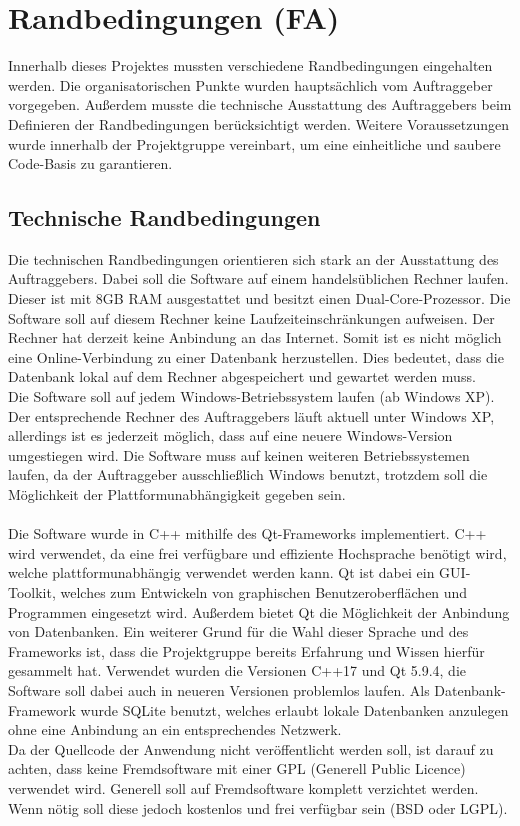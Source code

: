 \section{Randbedingungen (FA)}
Innerhalb dieses Projektes mussten verschiedene Randbedingungen eingehalten werden. Die organisatorischen Punkte wurden hauptsächlich vom Auftraggeber vorgegeben. Außerdem musste die technische Ausstattung des Auftraggebers beim Definieren der Randbedingungen berücksichtigt werden. Weitere Voraussetzungen wurde innerhalb der Projektgruppe vereinbart, um eine einheitliche und saubere Code-Basis zu garantieren.

\subsection{Technische Randbedingungen}
Die technischen Randbedingungen orientieren sich stark an der Ausstattung des Auftraggebers. Dabei soll die Software auf einem handelsüblichen Rechner laufen. Dieser ist mit 8GB RAM ausgestattet und besitzt einen Dual-Core-Prozessor. Die Software soll auf diesem Rechner keine Laufzeiteinschränkungen aufweisen. Der Rechner hat derzeit keine Anbindung an das Internet. Somit ist es nicht möglich eine Online-Verbindung zu einer Datenbank herzustellen. Dies bedeutet, dass die Datenbank lokal auf dem Rechner abgespeichert und gewartet werden muss.\\
Die Software soll auf jedem Windows-Betriebssystem laufen (ab Windows XP). Der entsprechende Rechner des Auftraggebers läuft aktuell unter Windows XP, allerdings ist es jederzeit möglich, dass auf eine neuere Windows-Version umgestiegen wird. Die Software muss auf keinen weiteren Betriebssystemen laufen, da der Auftraggeber ausschließlich Windows benutzt, trotzdem soll die Möglichkeit der Plattformunabhängigkeit gegeben sein.\\
\\
Die Software wurde in C++ mithilfe des Qt-Frameworks implementiert. C++ wird verwendet, da eine frei verfügbare und effiziente Hochsprache benötigt wird, welche plattformunabhängig verwendet werden kann. Qt ist dabei ein GUI-Toolkit, welches zum Entwickeln von graphischen Benutzeroberflächen und Programmen eingesetzt wird. Außerdem bietet Qt die Möglichkeit der Anbindung von Datenbanken. Ein weiterer Grund für die Wahl dieser Sprache und des Frameworks ist, dass die Projektgruppe bereits Erfahrung und Wissen hierfür gesammelt hat. Verwendet wurden die Versionen C++17 und Qt 5.9.4, die Software soll dabei auch in neueren Versionen problemlos laufen. Als Datenbank-Framework wurde SQLite benutzt, welches erlaubt lokale Datenbanken anzulegen ohne eine Anbindung an ein entsprechendes Netzwerk.\\
Da der Quellcode der Anwendung nicht veröffentlicht werden soll, ist darauf zu achten, dass keine Fremdsoftware mit einer GPL (Generell Public Licence) verwendet wird. Generell soll auf Fremdsoftware komplett verzichtet werden. Wenn nötig soll diese jedoch kostenlos und frei verfügbar sein (BSD oder LGPL).


